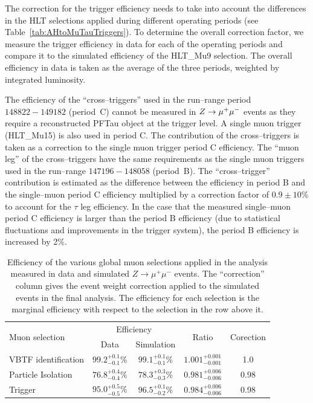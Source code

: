 The correction for the trigger efficiency needs to take into account the
differences in the HLT selections applied during different operating periods
(see Table~\ref{tab:AHtoMuTauTriggers}).  To determine the overall correction
factor, we measure the trigger efficiency in data for each of the operating
periods and compare it to the simulated efficiency of the HLT\_Mu9 selection.
The overall efficiency in data is taken as the average of the three periods,
weighted by integrated luminosity.

The efficiency of the ``cross--triggers'' used in the run--range period 
$148822-149182$ (period~C) cannot be measured in $\mbox{\ensuremath{Z\to\mu^+\mu^-}}$ events as they
require a reconstructed PFTau object at the trigger level.  A single muon trigger
(HLT\_Mu15) is also used in period C.  The contribution of the cross--triggers
is taken as a correction to the single muon trigger period C efficiency. The
``muon leg'' of the cross--triggers have the same requirements as the single
muon triggers used in the run--range $147196-148058$ (period~B).  The
``cross--trigger'' contribution is estimated as the difference between the
efficiency in period B and the single--muon period C efficiency multiplied by a
correction factor of $0.9 \pm 10\%$ to account for the $\tau$ leg efficiency.
In the case that the measured single--muon period C efficiency is larger than
the period B efficiency (due to statistical fluctuations and improvements in the
trigger system), the period B efficiency is increased by 2\%.

\begin{table}[t]
\begin{center}
\begin{tabular}{|l|c|c|c|c|}
\hline
\multirow{2}{*}{Muon selection} &  \multicolumn{2}{c|}{Efficiency} & \multirow{2}{*}{Ratio} & \multirow{2}{*}{Corection} \\ 
&  Data  &          Simulation &      &      \\ 
\hline
VBTF identification &   $99.2^{+0.1}_{-0.1}$\%  &  $99.1^{+0.1}_{-0.1}$\% & $1.001^{+0.001}_{-0.001}$ & 1.0\\
Particle Isolation  &  $76.8^{+0.4}_{-0.4}$\% &  $78.3^{+0.3}_{-0.3}$\% & $0.981^{+0.006}_{-0.006}$ & 0.98 \\
Trigger             &   $95.0^{+0.5}_{-0.5}$\% & $96.5^{+0.1}_{-0.2}$\% & $0.984^{+0.006}_{-0.006}$ & 0.98 \\
\hline
\end{tabular}
\end{center}
\begin{center}
\caption[Muon trigger, identification, and isolation correction
factors]{Efficiency of the various global muon selections applied in the
analysis measured in data and simulated $Z\rightarrow\mu^+\mu^-$ events.  The
``correction'' column gives the event weight correction applied to the simulated
events in the final analysis.  The efficiency for each selection is the marginal
efficiency with respect to the selection in the row above it.  }

\label{tab:muonTagAndProbeResults}
\end{center}
\end{table}


